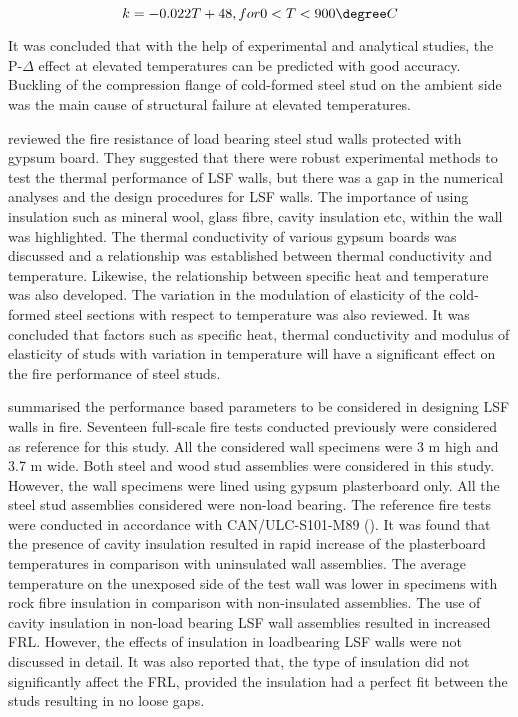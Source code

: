 \begin{equation}
k = -0.022T + 48, for 0 < T < 900\degree C
\end{equation}

It was concluded that with the help of experimental and analytical studies, the P-$\Delta$ effect at elevated temperatures can be predicted with good accuracy. Buckling of the compression flange of cold-formed steel stud on the ambient side was the main cause of structural failure at elevated temperatures.

\citet{Alfawakhiri1999} reviewed the fire resistance of load bearing steel stud walls protected with gypsum board. They suggested that there were robust experimental methods to test the thermal performance of LSF walls, but there was a gap in the numerical analyses and the design procedures for LSF walls. The importance of using insulation such as mineral wool, glass fibre, cavity insulation etc, within the wall was highlighted. The thermal conductivity of various gypsum boards was discussed and a relationship was established between thermal conductivity and temperature. Likewise, the relationship between specific heat and temperature was also developed. The variation in the modulation of elasticity of the cold-formed steel sections with respect to temperature was also reviewed. It was concluded that factors such as specific heat, thermal conductivity and modulus of elasticity of studs with variation in temperature will have a significant effect on the fire performance of steel studs.   

\citet{Sultan2000a} summarised the performance based parameters to be considered in designing LSF walls in fire. Seventeen full-scale fire tests conducted previously were considered as reference for this study. All the considered wall specimens were 3 m high and 3.7 m wide. Both steel and wood stud assemblies were considered in this study. However, the wall specimens were lined using gypsum plasterboard only. All the steel stud assemblies considered were non-load bearing. The reference fire tests were conducted in accordance with CAN/ULC-S101-M89 (\citeyear{ULC1989}). It was found that the presence of cavity insulation resulted in rapid increase of the plasterboard temperatures in comparison with uninsulated wall assemblies. The average temperature on the unexposed side of the test wall was lower in specimens with rock fibre insulation in comparison with non-insulated assemblies. The use of cavity insulation in non-load bearing LSF wall assemblies resulted in increased FRL. However, the effects of insulation in loadbearing LSF walls were not discussed in detail. It was also reported that, the type of insulation did not significantly affect the FRL, provided the insulation had a perfect fit between the studs resulting in no loose gaps.

